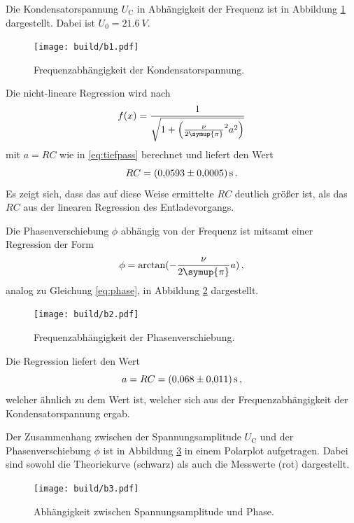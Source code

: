 Die Kondensatorspannung $U_\text{C}$ in Abhängigkeit der Frequenz ist in Abbildung \ref{fig:amplitude} dargestellt. Dabei ist $U_0 = \SI{21.6}{V}$.
\begin{figure}[H]
  \centering
  \texttt{[image: build/b1.pdf]}
  \caption{Frequenzabhängigkeit der Kondensatorspannung.}
  \label{fig:amplitude}
\end{figure}

Die nicht-lineare Regression wird nach
\begin{equation*}
  f(x) = \frac{1}{\sqrt{1+\left(\frac{\nu}{2\symup{\pi}}^2a^2\right)}}
\end{equation*}
mit $a = RC$ wie in \eqref{eq:tiefpass} berechnet und liefert den Wert
\begin{equation*}
  RC = \SI{0.0593 \pm 0.0005}{s} \,.
\end{equation*}
Es zeigt sich, dass das auf diese Weise ermittelte $RC$ deutlich größer ist, als das $RC$ aus der linearen Regression des Entladevorgangs.

Die Phasenverschiebung $\phi$ abhängig von der Frequenz ist mitsamt einer Regression der Form
\begin{equation*}
  \phi = \arctan(-\frac{\nu}{2\symup{\pi}}a) \,,
\end{equation*}
analog zu Gleichung \eqref{eq:phase}, in Abbildung \ref{fig:phasenversch} dargestellt.

\begin{figure}[H]
  \centering
  \texttt{[image: build/b2.pdf]}
  \caption{Frequenzabhängigkeit der Phasenverschiebung.}
  \label{fig:phasenversch}
\end{figure}

Die Regression liefert den Wert
\begin{equation*}
  a = RC = \SI{0.068 \pm 0.011}{s} \,,
\end{equation*}
welcher ähnlich zu dem Wert ist, welcher sich aus der Frequenzabhängigkeit der Kondensatorspannung ergab.

Der Zusammenhang zwischen der Spannungsamplitude $U_\text{C}$ und der Phasenverschiebung $\phi$ ist in Abbildung \ref{fig:eisbaer} in einem
Polarplot aufgetragen. Dabei sind sowohl die Theoriekurve (schwarz) als auch die Messwerte (rot) dargestellt.
\begin{figure}[H]
  \centering
  \texttt{[image: build/b3.pdf]}
  \caption{Abhängigkeit zwischen Spannungsamplitude und Phase.}
  \label{fig:eisbaer}
\end{figure}

